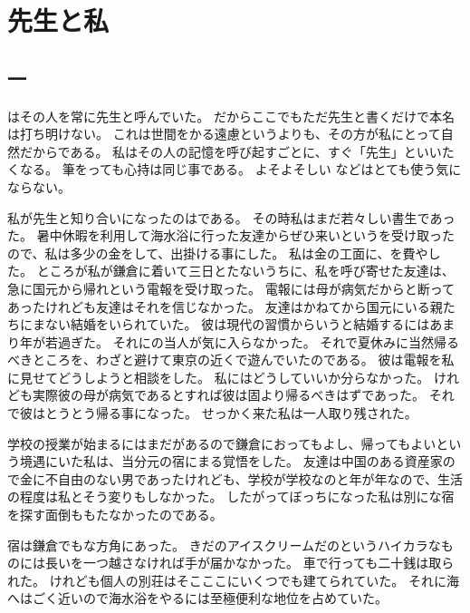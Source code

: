 \documentclass[uplatex,
  tate, %
  book,
  onecolumn, %
  paper=a6,  %
  twoside,
  openany,
  fontsize=9pt,       %
  jafontsize=9pt,     %
  number_of_lines=14, %
  line_length=35zh,   %
  baselineskip=16pt,  %
  hanging_punctuation,
]{jlreq}
\begin{document}
\pagecolor{background}

\chapter{先生と私}
\section{一}

はその人を常に先生と呼んでいた。 %
だからここでもただ先生と書くだけで本名は打ち明けない。
これは世間をかる遠慮というよりも、その方が私にとって自然だからである。
私はその人の記憶を呼び起すごとに、すぐ「先生」といいたくなる。
筆をっても心持は同じ事である。
よそよそしい などはとても使う気にならない。 %

私が先生と知り合いになったのはである。
その時私はまだ若々しい書生であった。
暑中休暇を利用して海水浴に行った友達からぜひ来いというを受け取ったので、私は多少の金をして、出掛ける事にした。
私は金の工面に、を費やした。
ところが私が鎌倉に着いて三日とたないうちに、私を呼び寄せた友達は、急に国元から帰れという電報を受け取った。
電報には母が病気だからと断ってあったけれども友達はそれを信じなかった。
友達はかねてから国元にいる親たちにまない結婚をいられていた。
彼は現代の習慣からいうと結婚するにはあまり年が若過ぎた。
それにの当人が気に入らなかった。
それで夏休みに当然帰るべきところを、わざと避けて東京の近くで遊んでいたのである。
彼は電報を私に見せてどうしようと相談をした。
私にはどうしていいか分らなかった。
けれども実際彼の母が病気であるとすれば彼は固より帰るべきはずであった。
それで彼はとうとう帰る事になった。
せっかく来た私は一人取り残された。

学校の授業が始まるにはまだがあるので鎌倉におってもよし、帰ってもよいという境遇にいた私は、当分元の宿にまる覚悟をした。
友達は中国のある資産家ので金に不自由のない男であったけれども、学校が学校なのと年が年なので、生活の程度は私とそう変りもしなかった。
したがってぼっちになった私は別にな宿を探す面倒ももたなかったのである。

宿は鎌倉でもな方角にあった。
きだのアイスクリームだのというハイカラなものには長いを一つ越さなければ手が届かなかった。
車で行っても二十銭は取られた。
けれども個人の別荘はそこここにいくつでも建てられていた。
それに海へはごく近いので海水浴をやるには至極便利な地位を占めていた。
\end{document}
